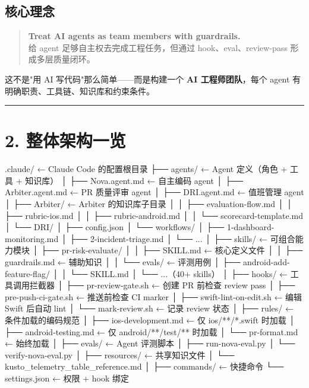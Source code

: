 \subsection{核心理念}

\begin{quote}
\textbf{Treat AI agents as team members with guardrails.}\\
给 agent 足够自主权去完成工程任务，但通过 hook、eval、review-pass 形成多层质量闭环。\\
\end{quote}

这不是"用 AI 写代码"那么简单------而是构建一个 \textbf{AI 工程师团队}，每个 agent 有明确职责、工具链、知识库和约束条件。


\bigskip\hrule\bigskip

\section{2. 整体架构一览}

\begin{codeblock}
.claude/                          ← Claude Code 的配置根目录
├── agents/                       ← Agent 定义（角色 + 工具 + 知识库）
│   ├── Nova.agent.md             ← 自主编码 agent
│   ├── Arbiter.agent.md          ← PR 质量评审 agent
│   ├── DRI.agent.md              ← 值班管理 agent
│   ├── Arbiter/                  ← Arbiter 的知识库子目录
│   │   ├── evaluation-flow.md
│   │   ├── rubric-ios.md
│   │   ├── rubric-android.md
│   │   └── scorecard-template.md
│   └── DRI/
│       ├── config.json
│       └── workflows/
│           ├── 1-dashboard-monitoring.md
│           ├── 2-incident-triage.md
│           └── ...
│
├── skills/                       ← 可组合能力模块
│   ├── pr-risk-evaluate/
│   │   ├── SKILL.md              ← 核心定义文件
│   │   ├── guardrails.md         ← 辅助知识
│   │   └── evals/                ← 评测用例
│   ├── android-add-feature-flag/
│   │   └── SKILL.md
│   └── ...（40+ skills）
│
├── hooks/                        ← 工具调用拦截器
│   ├── pr-review-gate.sh         ← 创建 PR 前检查 review pass
│   ├── pre-push-ci-gate.sh       ← 推送前检查 CI marker
│   ├── swift-lint-on-edit.sh     ← 编辑 Swift 后自动 lint
│   └── mark-review.sh            ← 记录 review 状态
│
├── rules/                        ← 条件加载的编码规范
│   ├── ios-development.md        ← 仅 ios/**/*.swift 时加载
│   ├── android-testing.md        ← 仅 android/**/test/** 时加载
│   └── pr-format.md              ← 始终加载
│
├── evals/                        ← Agent 评测脚本
│   ├── run-nova-eval.py
│   └── verify-nova-eval.py
│
├── resources/                    ← 共享知识文件
│   └── kusto_telemetry_table_reference.md
│
├── commands/                     ← 快捷命令
└── settings.json                 ← 权限 + hook 绑定
\end{codeblock}

